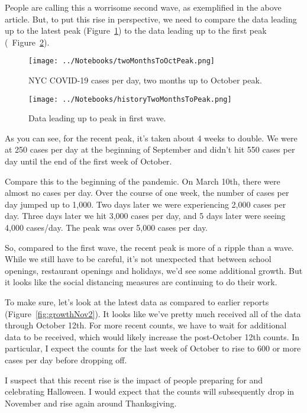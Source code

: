 \documentclass[10pt,reqno]{amsart}
\begin{document}
People are calling this a worrisome second wave, as exemplified in the
above article.  But, to put this rise in perspective, we need to
compare the data leading up to the latest peak
(Figure~\ref{fig:secondPeak}) to the data leading up to the first peak
(~Figure~\ref{fig:firstPeak}).

\begin{figure}[h!tbp]
  \centering
  \texttt{[image: ../Notebooks/twoMonthsToOctPeak.png]}
  \caption{NYC COVID-19 cases per day, two months up to October peak.}
  \label{fig:secondPeak}
\end{figure}

\begin{figure}[h!btp]
  \centering
  \texttt{[image: ../Notebooks/historyTwoMonthsToPeak.png]}
  \caption{Data leading up to peak in first wave.}
  \label{fig:firstPeak}
\end{figure}

As you can see, for the recent peak, it's taken about 4 weeks to
double.  We were at 250 cases per day at the beginning of September and
didn't hit 550 cases per day until the end of the first week of October.

Compare this to the beginning of the pandemic.  On March 10th, there
were almost no cases per day.  Over the course of one week, the number
of cases per day jumped up to 1,000.  Two days later we were
experiencing 2,000 cases per day.  Three days later we hit 3,000
cases per day, and 5 days later were seeing 4,000 cases/day.  The peak
was over 5,000 cases per day.

So, compared to the first wave, the recent peak is more of a ripple
than a wave.  While we still have to be careful, it's not unexpected
that between school openings, restaurant openings and holidays, we'd
see some additional growth.  But it looks like the social distancing
measures are continuing to do their work.

To make sure, let's look at the latest data as compared to
earlier reports (Figure~\ref{fig:growthNov2}).  It looks like we've
pretty much received all of the data through October 12th.  For more
recent counts, we have to wait for additional data to be received,
which would likely increase the post-October 12th counts.  In
particular, I expect the counts for the last week of October to rise
to 600 or more cases per day before dropping off.

I suspect that this recent rise is the impact of people
preparing for and celebrating Halloween.  I would expect that the
counts will subsequently drop in November and rise again around
Thanksgiving.
\end{document}
